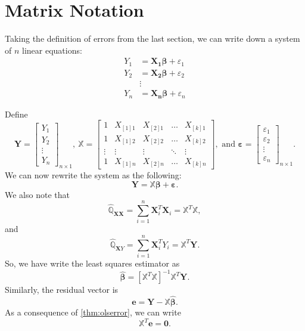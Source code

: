 \documentclass[
]{book}
\theoremstyle{definition}
\theoremstyle{definition}
\theoremstyle{definition}
\theoremstyle{definition}
\theoremstyle{remark}
\begin{document}
\hypertarget{matrix-notation}{%
\section{Matrix Notation}\label{matrix-notation}}

Taking the definition of errors from the last section, we can write down a system of \(n\) linear equations:
\[
\begin{aligned}
Y_1 &= {\boldsymbol{X_1}}{\boldsymbol{\beta}} + \varepsilon_1 \\
Y_2 &= {\boldsymbol{X_2}}{\boldsymbol{\beta}} + \varepsilon_2 \\
& \vdots \\
Y_n &= {\boldsymbol{X_n}}{\boldsymbol{\beta}} + \varepsilon_n
\end{aligned}
\]

Define
\[
{\boldsymbol{Y}}=\begin{bmatrix}
Y_1 \\
Y_2 \\
\vdots \\
Y_n
\end{bmatrix}_{n\times1},\ 
\mathbb{X}=\begin{bmatrix}
1 & X_{[1]1} & X_{[2]1} & \ldots & X_{[k]1} \\
1 & X_{[1]2} & X_{[2]2} & \ldots & X_{[k]2} \\
\vdots & \vdots & \vdots & \ddots & \vdots \\
1 & X_{[1]n} & X_{[2]n} & \ldots & X_{[k]n}
\end{bmatrix},\mbox{ and }
{\boldsymbol{\varepsilon}}=\begin{bmatrix}
\varepsilon_1 \\
\varepsilon_2 \\
\vdots \\
\varepsilon_n
\end{bmatrix}_{n\times1}.
\]
We can now rewrite the system as the following:
\[
{\boldsymbol{Y}}={\mathbb{X}}{\boldsymbol{\beta}}+{\boldsymbol{\varepsilon}}.
\]
We also note that
\[
\widehat{{\mathbb{Q}}}_{{\boldsymbol{XX}}}=\sum\limits_{i=1}^n{\boldsymbol{X}}^T_i{\boldsymbol{X}}_i=
{\mathbb{X}}^T{\mathbb{X}},
\]
and
\[
\widehat{{\mathbb{Q}}}_{{\boldsymbol{X}}Y}=\sum\limits_{i=1}^n{\boldsymbol{X}}_i^TY_i=
{\mathbb{X}}^T{\boldsymbol{Y}}.
\]
So, we have write the least squares estimator as
\[
\widehat{{\boldsymbol{\beta}}}=\left[{\mathbb{X}}^T{\mathbb{X}}\right]^{-1}{\mathbb{X}}^T{\boldsymbol{Y}}.
\]
Similarly, the residual vector is
\[
{\boldsymbol{e}}={\boldsymbol{Y}}-{\mathbb{X}}\widehat{{\boldsymbol{\beta}}}.
\]
As a consequence of \ref{thm:olserror}, we can write
\[
{\mathbb{X}}^T{\boldsymbol{e}}={\boldsymbol{0}}.
\]
\end{document}
